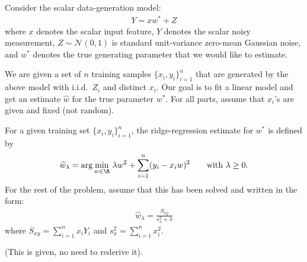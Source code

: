 \documentclass[preview]{standalone}
\begin{document}
\newcommand{\whatridge}{\widehat{w}_\lambda}
Consider the scalar data-generation model:
\begin{align*}
    Y = xw^* + Z
\end{align*}
where $x$ denotes the scalar input feature, $Y$ denotes the scalar noisy measurement,
$Z \sim \mathcal{N}(0, 1)$ is standard unit-variance zero-mean Gaussian noise,
and $w^*$ denotes 
the true generating parameter that we would like to estimate.

We are given a set of $n$ training samples $\{x_i, y_i\}_{i=1}^n$ that
are generated by the above model with i.i.d.~$Z_i$ and distinct $x_i$. Our goal is to fit a linear model and get an estimate $\widehat{w}$
for the true parameter $w^*$. For all parts, assume that $x_i$'s are given and fixed (not random).

For a given training set $\{x_i, y_i\}_{i=1}^n$, the ridge-regression
estimate for $w^*$ is defined by
\begin{align*}
    \whatridge
    =\arg\min_{w \in \R} \, \lambda w^2 + \sum_{i=1}^n (y_i - x_i w)^2 \qquad\text{with $\lambda \geq 0.$}
\end{align*}
For the rest of the problem, assume that this has been solved and
written in the form:
\begin{align}
\whatridge = \frac{S_{xy}}{s^2_{x}+\lambda}
\end{align}
where $S_{xy} = \sum_{i=1}^n x_i Y_i$ and $s_{x}^2 = \sum_{i=1}^n x_i^2$.

(This is given, no need to rederive it).
\end{document}
